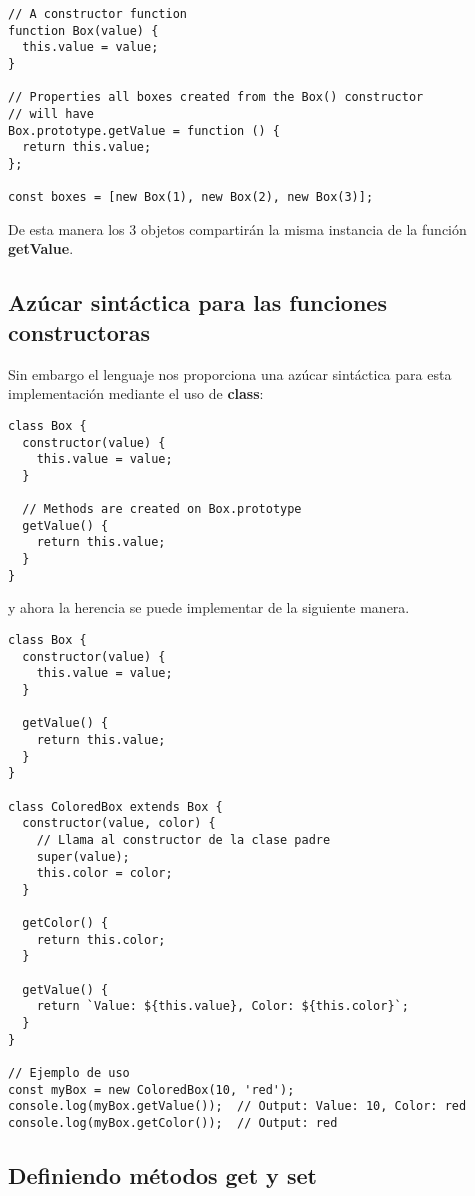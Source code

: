 \documentclass{article}
\begin{document}
\begin{lstlisting}
// A constructor function
function Box(value) {
  this.value = value;
}

// Properties all boxes created from the Box() constructor
// will have
Box.prototype.getValue = function () {
  return this.value;
};

const boxes = [new Box(1), new Box(2), new Box(3)];
\end{lstlisting}

De esta manera los 3 objetos compartirán la misma instancia de la función \textbf{getValue}.

\subsection{Azúcar sintáctica para las funciones constructoras}

Sin embargo el lenguaje nos proporciona una azúcar sintáctica para esta implementación mediante
el uso de \textbf{class}:

\begin{lstlisting}
class Box {
  constructor(value) {
    this.value = value;
  }

  // Methods are created on Box.prototype
  getValue() {
    return this.value;
  }
}
\end{lstlisting}

y ahora la herencia se puede implementar de la siguiente manera.

\begin{lstlisting}
class Box {
  constructor(value) {
    this.value = value;
  }

  getValue() {
    return this.value;
  }
}

class ColoredBox extends Box {
  constructor(value, color) {
    // Llama al constructor de la clase padre
    super(value);
    this.color = color;
  }

  getColor() {
    return this.color;
  }

  getValue() {
    return `Value: ${this.value}, Color: ${this.color}`;
  }
}

// Ejemplo de uso
const myBox = new ColoredBox(10, 'red');
console.log(myBox.getValue());  // Output: Value: 10, Color: red
console.log(myBox.getColor());  // Output: red

\end{lstlisting}

\subsection{Definiendo métodos get y set}
\end{document}
